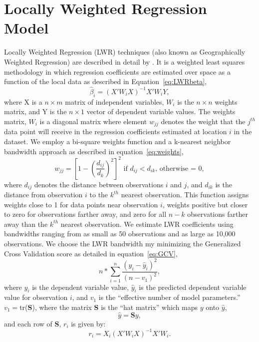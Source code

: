 \documentclass{article}\usepackage{graphicx, color}
\begin{document}
\section{Locally Weighted Regression Model}
Locally Weighted Regression (LWR) techniques (also known as Geographically Weighted Regression) are described in detail by \citet{Brunsdon1998b}. It is a weighted least squares methodology in which regression coefficients are estimated over space as a function of the local data as described in Equation~\eqref{eq:LWRbeta},
\begin{equation}\label{eq:LWRbeta}
\hat{\beta}_i = (X'W_iX)^{-1}X'W_iY,
\end{equation}
where X is a $n \times m$ matrix of independent variables, $W_i$ is the $n \times n$ weights matrix, and Y is the $n \times 1$ vector of dependent variable values. The weights matrix, $W_i$ is a diagonal matrix where element $w_{jj}$ denotes the weight that the $j^{th}$ data point will receive in the regression coefficients estimated at location $i$ in the dataset. We employ a bi-square weights function and a k-nearest neighbor bandwidth approach as described in equation~\eqref{eq:weights}, 
\begin{equation}\label{eq:weights}
w_{jj}=\left[1-\left(\frac{d_{ij}}{d_{k}}\right)^2 \right]^2 \textrm{ if  }d_{ij}<d_{ik}\textrm{, otherwise = 0},
\end{equation}
where $d_{ij}$ denotes the distance between observations $i$ and $j$, and $d_{ik}$ is the distance from observation $i$ to the $k^{th}$ nearest observation. This function assigns weights close to 1 for data points near observation $i$, weights positive but closer to zero for observations farther away, and zero for all $n-k$ observations farther away than the $k^{th}$ nearest observation. 
We estimate LWR coefficients using bandwidths ranging from as small as 50 observations and as large as 10,000 observations. We choose the LWR bandwidth my minimizing the Generalized Cross Validation score as detailed in equation~\eqref{eq:GCV},
\begin{equation}\label{eq:GCV}
n*\sum_{i=1}^{n}\frac{(y_i-\hat{y}_i)^2}{(n-v_1)^2}, 
\end{equation} 
where $y_i$ is the dependent variable value, $\hat{y}_i$ is the predicted dependent variable value for observation $i$, and $v_1$ is the ``effective number of model parameters.''
$v_1=$tr(\textbf{S}), where the matrix \textbf{S} is the ``hat matrix'' which maps $y$ onto $\hat{y}$,
                   \begin{equation*}
                   \hat{y}=\textbf{S}y,
                   \end{equation*}
                   and each row of \textbf{S}, $r_i$ is given by:
                     \begin{equation*}
                   r_i=X_i(X'W_iX)^{-1}X'W_i.
                   \end{equation*}                
\end{document}
